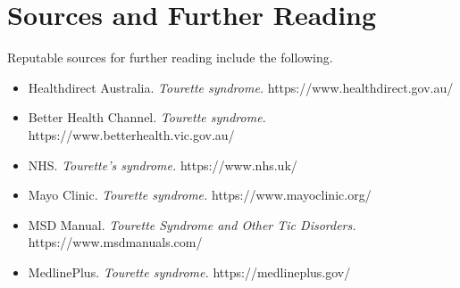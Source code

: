 \section*{Sources and Further Reading}
Reputable sources for further reading include the following.

\begin{itemize}
    \item Healthdirect Australia. \textit{Tourette syndrome.} https://www.healthdirect.gov.au/
    \item Better Health Channel. \textit{Tourette syndrome.} https://www.betterhealth.vic.gov.au/
    \item NHS. \textit{Tourette's syndrome.} https://www.nhs.uk/
    \item Mayo Clinic. \textit{Tourette syndrome.} https://www.mayoclinic.org/
    \item MSD Manual. \textit{Tourette Syndrome and Other Tic Disorders.} https://www.msdmanuals.com/
    \item MedlinePlus. \textit{Tourette syndrome.} https://medlineplus.gov/
\end{itemize}
